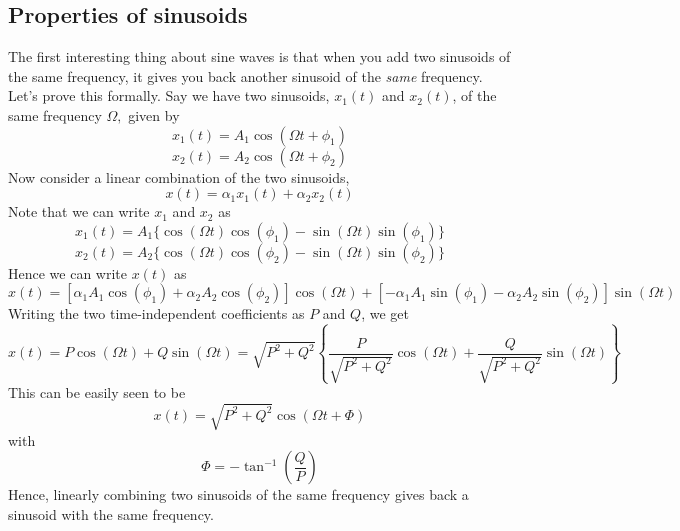 \subsection{Properties of sinusoids}
The first interesting thing about sine waves is that when you add two sinusoids
of the same frequency, it gives you back another sinusoid of the \emph{same}
frequency. Let's prove this formally.
Say we have two sinusoids, $x_1 (t)$ and $x_2 (t)$, of the same frequency
$\Omega,$ given by
\begin{equation*}
x_1 (t) = A_1 \cos (\Omega t + \phi_1)
\end{equation*}
\begin{equation*}
x_2 (t) = A_2 \cos (\Omega t + \phi_2)
\end{equation*}
Now consider a linear combination of the two sinusoids,
\begin{equation*}
x (t) = \alpha_1 x_1 (t) + \alpha_2 x_2 (t)
\end{equation*}
Note that we can write $x_1$ and $x_2$ as
\begin{equation*}
x_1 (t) = A_1  \{ \cos (\Omega t) \cos (\phi_1) - \sin (\Omega t) \sin (\phi_1) \}
\end{equation*}
\begin{equation*}
x_2 (t) = A_2  \{ \cos (\Omega t) \cos (\phi_2) - \sin (\Omega t) \sin (\phi_2) \}
\end{equation*}
Hence we can write $x (t)$ as
\begin{equation*}
x (t) = [ \alpha_1 A_1 \cos (\phi_1) + \alpha_2 A_2 \cos (\phi_2) ] \cos
   (\Omega t) + [ - \alpha_1 A_1 \sin (\phi_1) - \alpha_2 A_2 \sin
   (\phi_2) ] \sin (\Omega t)
\end{equation*}
Writing the two time-independent coefficients as $P$ and $Q$, we get
\begin{equation*}
 x (t) = P \cos (\Omega t) + Q \sin (\Omega t) = \sqrt{P^2 + Q^2}  \left\{
   \frac{P}{\sqrt{P^2 + Q^2}} \cos (\Omega t) + \frac{Q}{\sqrt{P^2 + Q^2}}
   \sin (\Omega t) \right\}
\end{equation*}
This can be easily seen to be
\begin{equation*}
 x (t) = \sqrt{P^2 + Q^2} \cos (\Omega t + \Phi)
\end{equation*}
with
\begin{equation*}
\Phi = - \tan^{- 1} \left( \frac{Q}{P} \right)
\end{equation*}
Hence, linearly combining two sinusoids of the same frequency gives back a
sinusoid with the same frequency.\\
